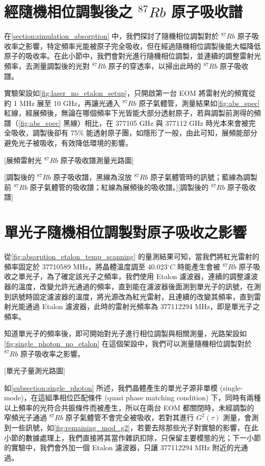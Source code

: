 \documentclass[class=NCU_thesis, crop=false]{standalone}
\begin{document}
\section{經隨機相位調製後之 $^{87}Rb$ 原子吸收譜}

在\cref{section:simulation_absorption} 中，我們探討了隨機相位調製對於 $^{87}Rb$ 原子吸收率之影響，特定頻率光能被原子完全吸收，但在經過隨機相位調製後能大幅降低原子的吸收率。在此小節中，我們會對光進行隨機相位調製，並連續的調整雷射光頻率，去測量調製後的光對 $^{87}Rb$ 原子的穿透率，以掃出此時的 $^{87}Rb$ 原子吸收譜。

實驗架設如\cref{fig:laser_no_etalon_setup}，只開啟第一台 EOM 將雷射光的頻寬從約 1 MHz 展至 10 GHz，再讓光通入 $^{87}Rb$ 原子氣體管，測量結果如\cref{fig:abs_spec} 紅線，經展頻後，無論在哪個頻率下光皆能大部分透射原子，若與調製前測得的頻譜（\cref{fig:abs_spec} 黑線）相比，在 377105 GHz 與 377112 GHz 時光本來會被完全吸收，調製後卻有 75\% 能透射原子團，如隱形了一般，由此可知，展頻能部分避免光子被吸收，有效降低環境的影響。

[展頻雷射光 $^{87}Rb$ 原子吸收譜測量光路圖]

[調製後的 $^{87}Rb$ 原子吸收譜，黑線為沒放 $^{87}Rb$ 原子氣體管時的訊號；藍線為調製前 $^{87}Rb$ 原子氣體管的吸收譜；紅線為展頻後的吸收譜。][調製後的 $^{87}Rb$ 原子吸收譜]

\section{單光子隨機相位調製對原子吸收之影響}
從\cref{fig:absorption_etalon_temp_scanning} 的量測結果可知，當我們將紅光雷射的頻率固定於 37710589 MHz，將晶體溫度調至 40.023$^{\circ}C$ 時能產生會被 $^{87}Rb$ 原子吸收之單光子，為了確定該光子之頻率，我們使用 Etalon 濾波器，連續的調整濾波器的溫度，改變允許光通過的頻率，直到能在濾波器後面測到單光子的訊號，在測到訊號時固定濾波器的溫度，將光源改為紅光雷射，且連續的改變其頻率，直到雷射光能通過 Etalon 濾波器，此時的雷射光頻率為 377112294 MHz，即是單光子之頻率。

知道單光子的頻率後，即可開始對光子進行相位調製與相關測量，光路架設如\cref{fig:single_photon_no_etalon} 在這個架設中，我們可以測量隨機相位調製對於 $^{87}Rb$ 原子吸收率之影響。

[單光子量測光路圖]

如\cref{subsection:single_photon} 所述，我們晶體產生的單光子源非單模 (single-mode)，在這組準相位匹配條件 (quasi phase matching condition) 下，同時有兩種以上頻率的光符合共振條件而被產生，所以在兩台 EOM 都關閉時，未經調製的窄頻光子通過 $^{87}Rb$ 原子氣體管不會完全被吸收，若對其進行 $G^{2}(\tau)$ 測量，會測到一些訊號，如\cref{fig:remaining_mod_g2}，若要去除那些光子對實驗的影響，在此小節的數據處理上，我們直接將其當作雜訊扣除，只保留主要模態的光；下一小節的實驗中，我們會外加一個 Etalon 濾波器，只讓 377112294 MHz 附近的光通過。
\end{document}
